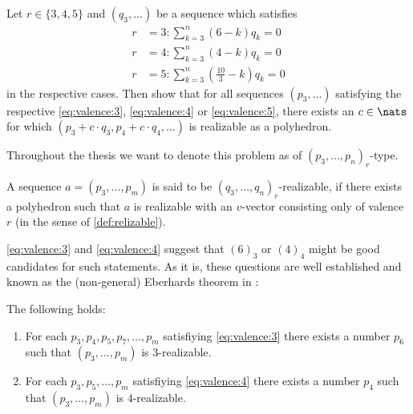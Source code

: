 \begin{problem}
  Let $r \in \{3, 4, 5\}$ and $(q_3, \dots)$ be a sequence which satisfies 
  \begin{align}
    r &= 3: \sum_{k=3}^n \left( 6            - k \right) q_k = 0 \label{eq:zero:curv:3}\\
    r &= 4: \sum_{k=3}^n \left( 4            - k \right) q_k = 0 \label{eq:zero:curv:4}\\
    r &= 5: \sum_{k=3}^n \left( \frac{10}{3} - k \right) q_k = 0 \label{eq:zero:curv:5}
  \end{align}
  in the respective cases. Then show that for all sequences $(p_3, \dots)$  satisfying the respective \autoref{eq:valence:3}, \autoref{eq:valence:4} or \autoref{eq:valence:5}, there exists an $c \in \nats$ for which $(p_3 + c \cdot q_3, p_4 + c \cdot q_4, \dots)$ is realizable as a polyhedron.
\end{problem}
\begin{notation}
  Throughout the thesis we want to denote this problem as of $(p_3, \dots, p_n)_r$-type.
\end{notation}
\begin{definition}[$r$-realizable]
  A sequence $a = (p_3, \dots, p_m)$ is said to be $(q_3, \dots, q_n)_r$-realizable, if there exists a polyhedron such that $a$ is realizable with an $v$-vector consisting only of valence $r$ (in the sense of \autoref{def:relizable}).
\end{definition}

\autoref{eq:valence:3} and \autoref{eq:valence:4} suggest that $(6)_3$ or $(4)_4$ might be good candidates for such statements. As it is, these questions are well established and known as the (non-general) Eberhards theorem in \cite{ConvexPolytopes}:
\renewcommand{\Itemautorefname}{Theorem \ref{thm:eberhard}}
\begin{theorem} \label{thm:eberhard} The following holds:
  \begin{enumerate}[label=(\roman*)]
  \item \label{thm:eberhard:3} For each $p_3, p_4, p_5, p_7, \dots, p_m$ satisfiying \autoref{eq:valence:3} there exists a number $p_6$ such that $(p_3, \dots, p_m)$ is $3$-realizable. 
  \item \label{thm:eberhard:4} For each $p_3, p_5, \dots, p_m$ satisfiying \autoref{eq:valence:4} there exists a number $p_4$ such that $(p_3, \dots, p_m)$ is $4$-realizable. 
  \end{enumerate}
\end{theorem}

